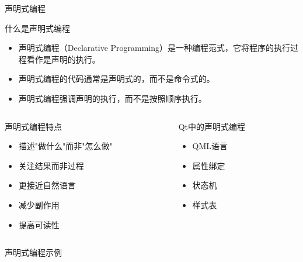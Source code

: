 \documentclass[UTF8,aspectratio=169]{beamer}
\begin{document}
\begin{frame}{声明式编程}
    \begin{ytublock}{什么是声明式编程}
        \begin{itemize}
            \item 声明式编程（Declarative Programming）是一种编程范式，它将程序的执行过程看作是声明的执行。
            \item 声明式编程的代码通常是声明式的，而不是命令式的。
            \item 声明式编程强调声明的执行，而不是按照顺序执行。
        \end{itemize}
    \end{ytublock}
    \begin{columns}
        \begin{column}{0.48\textwidth}
            \begin{ytublock}{声明式编程特点}
                \begin{itemize}
                    \item 描述"做什么"而非"怎么做"
                    \item 关注结果而非过程
                    \item 更接近自然语言
                    \item 减少副作用
                    \item 提高可读性
                \end{itemize}
            \end{ytublock}
        \end{column}
        \begin{column}{0.48\textwidth}
            \begin{ytublock}{Qt中的声明式编程}
                \begin{itemize}
                    \item QML语言
                    \item 属性绑定
                    \item 状态机
                    \item 样式表
                \end{itemize}
            \end{ytublock}
        \end{column}
    \end{columns}
\end{frame}

\begin{frame}[fragile]{声明式编程示例}
    \begin{columns}
        \begin{column}{0.48\textwidth}
            \inputminted[firstline=1,lastline=20]{cpp}{code/declarative_programming.cpp}
        \end{column}
        \begin{column}{0.48\textwidth}
            \inputminted[firstline=21,lastline=35]{cpp}{code/declarative_programming.cpp}
        \end{column}
    \end{columns}
\end{frame}
\end{document}
